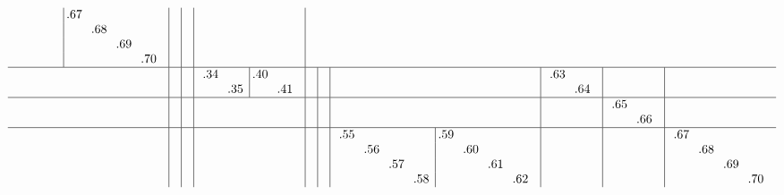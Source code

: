 \documentclass[12pt,a4paper,landscape]{amsart}
\begin{document}
\begin{align*}
\begin{array}{c|c|c|c|c|c|c|c|c|c}
\begin{array}{rrrr|rrrr}
  &  &  &  &\llap.67&  &  &  \\%
  &  &  &  &  &\llap.68&  &  \\%
  &  &  &  &  &  &\llap.69&  \\%
  &  &  &  &  &  &  &\llap.70\\%
\end{array}%
&&&\\\hline
&&&
\begin{array}{rr|rr}%
\llap.34&  &\llap.40&  \\%
  &\llap.35&  &\llap.41\\%
\end{array}%
&&&&
\begin{array}{rr}%
\llap.63&  \\%
  &\llap.64\\%
\end{array}%
&&\\\hline
&&&&&&&&
\begin{array}{rr}%
\llap.65&  \\%
  &\llap.66\\%
\end{array}%
&\\\hline
&&&&&&
\begin{array}{rrrr|rrrr}%
\llap.55&  &  &  &\llap.59&  &  &  \\%
  &\llap.56&  &  &  &\llap.60&  &  \\%
  &  &\llap.57&  &  &  &\llap.61&  \\%
  &  &  &\llap.58&  &  &  &\llap.62\\%
\end{array}%
&&&
\begin{array}{rrrr}%
\llap.67&  &  &  \\%
  &\llap.68&  &  \\%
  &  &\llap.69&  \\%
  &  &  &\llap.70\\%
\end{array}%
  \end{array}
\end{align*}
\end{document}
